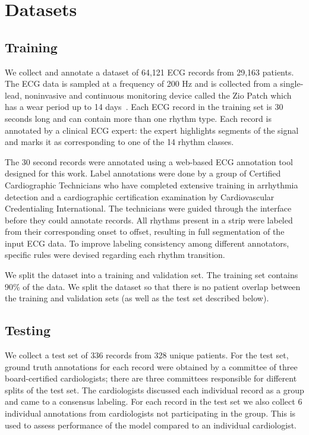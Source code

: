 \section{Datasets}
\label{sec:arrhythmias:data}

\subsection*{Training}
We collect and annotate a dataset of 64,121 ECG records from 29,163 patients.
The ECG data is sampled at a frequency of 200 Hz and is collected from a
single-lead, noninvasive and  continuous monitoring device called the Zio Patch
which has a wear period up to 14 days~\cite{turakhia2013diagnostic}. Each ECG
record in the training set is 30 seconds long and can contain more than one
rhythm type. Each record is annotated by a clinical ECG expert: the expert
highlights segments of the signal and marks it as corresponding to one of the
14 rhythm classes.

The 30 second records were annotated using a web-based ECG annotation tool
designed for this work. Label annotations were done by a group of Certified
Cardiographic Technicians who have completed extensive training in arrhythmia
detection and a cardiographic certification examination by Cardiovascular
Credentialing International. The technicians were guided through the interface
before they could annotate records. All rhythms present in a strip were labeled
from their corresponding onset to offset, resulting in full segmentation of the
input ECG data. To improve labeling consistency among different annotators,
specific rules were devised regarding each rhythm transition.

We split the dataset into a training and validation set. The training set
contains 90\% of the data. We split the dataset so that there is no patient
overlap between the training and validation sets (as well as the test set
described below).

\subsection*{Testing}
We collect a test set of 336 records from 328 unique patients. For the test
set, ground truth annotations for each record were obtained by a committee of
three board-certified cardiologists; there are three committees responsible for
different splits of the test set. The cardiologists discussed each individual
record as a group and came to a consensus labeling. For each record in the test
set we also collect 6 individual annotations from cardiologists not
participating in the group. This is used to assess performance of the model
compared to an individual cardiologist.

